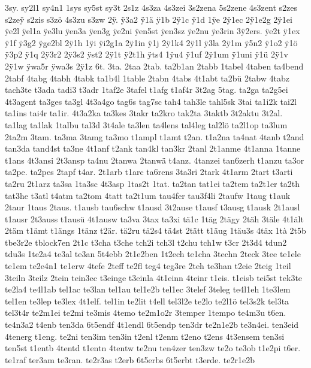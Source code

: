 {3sy.
sy2l1
sy4n1
1sys
sy5st
sy3t
2s1z
4s3za
4s3zei
3s2zena
5s2zene
4s3zent
s2zes
s2ze^^ff
s2zis
s3zö
4s3zu
s3zw
2^^ff.
^^ff3a2
^^ff1ä
^^ff1b
2^^ff1c
^^ff1d
1^^ffe
2^^ff1ec
2^^ff1e2g
2^^ff1ei
^^ffe2l
^^ffel1a
^^ffe3lu
^^ffen3a
^^ffen3g
^^ffe2ni
^^ffen5st
^^ffen3sz
^^ffe2nu
^^ffe3rin
3^^ff2ers.
^^ffe2t
^^ff1ex
^^ff1f
^^ff3g2
^^ffge2bl
2^^ff1h
1^^ffi
^^ffi2g1a
2^^ff1in
^^ff1j
2^^ff1k4
2^^ff1l
^^ff3la
2^^ff1m
^^ff5n2
^^ff1o2
^^ff1ö
^^ff3p2
^^ff1q
2^^ff3r2
2^^ff3s2
^^ffst2
2^^ff1t
^^ff2t1h
^^ffts4
1^^ffu4
^^ff1uf
2^^ff1um
^^ff1uni
^^ff1ü
2^^ff1v
2^^ff1w
^^ffwa5r
^^ffwa3s
2^^ff1z
6t.
3ta.
2taa
2tab.
ta2b1an
2tabb
1tabel
4taben
ta4bend
2tabf
4tabg
4tabh
4tabk
ta1b4l
1table
2tabn
4tabs
4t1abt
ta2bü
2tabw
4tabz
tach3te
t3ada
tadi3
t3adr
1taf2e
3tafel
t1afg
t1af4r
3t2ag
5tag.
ta2ga
ta2g5ei
4t3agent
ta3ges
ta3gl
4t3a4go
tag6s
tag7sc
tah4
tah3le
tahl5sk
3tai
ta1i2k
tai2l
ta1ins
tai4r
ta1ir.
4t3a2ka
ta3kes
3takr
ta2kro
tak2ta
3taktb
3t2aktu
3t2al.
ta1lag
ta1lak
1talbu
tal3d
3t4ale
ta3len
ta4lens
tal4leg
tal2lö
ta2l1op
ta3lum
2ta2m
3tam.
ta3ma
3tamg
ta3mo
t1ampl
t1amt
t2an.
t1a2na
ta4nat
4tanb
t2and
tan3da
tand4st
ta3ne
4t1anf
t2ank
tan4kl
tan3kr
2tanl
2t1anme
4t1anna
1tanne
t1ans
4t3ansi
2t3ansp
ta4nu
2tanwa
2tanwä
t4anz.
4tanzei
tan6zerh
t1anzu
ta3or
ta2pe.
ta2pes
2tapf
t4ar.
2t1arb
t1arc
ta6rens
3ta3ri
2tark
4t1arm
2tart
t3arti
ta2ru
2t1arz
ta3sa
1ta3sc
4t3asp
1tas2t
1tat.
ta2tan
tat1ei
ta2tem
ta2t1er
ta2th
tat3he
t3atl
t4atm
ta2tom
4tatt
ta2t1um
tau4fer
tau3f4li
2taufw
1taug
t1auk
2taur
1taus
2taus.
t1ausb
tau6schw
t1ausd
3t2ause
t1ausf
t3ausg
t1ausk
2t1ausl
t1ausr
2t3auss
t1ausü
4t1ausw
ta3va
3tax
ta3xi
tä1c
1täg
2tägy
2täh
3täle
4t1ält
2täm
t1ämt
t1ängs
1tänz
t2är.
tä2ru
tä2s4
tä4st
2tätt
t1äug
1täu3s
4täx
1tà
2t5b
tbe3r2e
tblock7en
2t1c
t3cha
t3che
tch2i
tch3l
t2chu
tch1w
t3cr
2t3d4
tdun2
tdu3s
1te2a4
te3al
te3an
5t4ebb
2t1e2ben
1t2ech
te1cha
3techn
2teck
3tee
te1ele
te1em
te2e4n1
te1erw
4tefe
2teff
te2fl
teg4
teg3re
2teh
te3han
t2eie
2teig
1teil
3teiln
3teilz
2tein
tein3ec
t3einge
t3einla
4t1einn
4teinr
t1eis.
t1eisb
tei5st
tek3te
te2la4
te4l1ab
tel1ac
te3lan
tel1au
tel1e2b
tel1ec
3telef
3teleg
te4l1eh
1te3lem
tel1en
te3lep
te3lex
4t1elf.
tel1in
te2lit
t4ell
tel3l2e
te2lo
te2l1ö
tel3s2k
tel3ta
tel3t4r
te2m1ei
te2mi
te3mis
4temo
te2m1o2r
3temper
1tempo
te4m3u
t6en.
te4n3a2
t4enb
ten3da
6t5endf
4t1endl
6t5endp
ten3dr
te2n1e2b
te3n4ei.
ten3eid
4tenerg
t1eng.
te2ni
ten3im
ten3in
t2enl
t2enm
t2eno
t2ens
4t3ensem
ten3si
ten5st
t1entb
4tentd
t1entn
4tentw
te2nu
ten4zer
ten3zw
te2o
te3ob
t1e2pi
t6er.
te1raf
ter3am
te3ran.
te2r3as
t2erb
6t5erbs
6t5erbt
t3erde.
te2r1e2b
}
